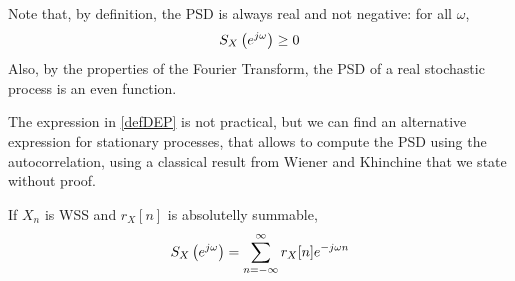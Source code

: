 Note that, by definition, the PSD is always real and not negative:
for all $\omega$,
\begin{equation}
S_X\left(e^{j \omega}\right) \ge 0
\end{equation}
Also, by the properties of the Fourier Transform, the PSD of a real stochastic process is an even function.

The expression in \eqref{defDEP} is not practical, but we can find an alternative expression for stationary processes, that allows to compute the PSD using the autocorrelation, using a classical result from Wiener and Khinchine that we state without proof.

\begin{theorem}

If $X_n$ is WSS and $r_X[n]$ is absolutelly summable, 
\begin{equation}
S_X\left(e^{j \omega}\right) = \sum_{n=-\infty}^{\infty} r_X[n] e^{-j \omega n}
\label{DEPEst}
\end{equation}

\end{theorem}


